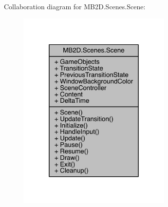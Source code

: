 Collaboration diagram for M\+B2\+D.\+Scenes.\+Scene\+:
\nopagebreak
\begin{figure}[H]
\begin{center}
\leavevmode
\includegraphics[width=217pt]{class_m_b2_d_1_1_scenes_1_1_scene__coll__graph}
\end{center}
\end{figure}
